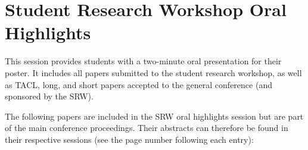 



\section[SRW Oral Highlights]{Student Research Workshop Oral Highlights}
\label{srw-oral-session}

This session provides students with a two-minute oral presentation for
their poster. It includes all papers submitted to the student research
workshop, as well as TACL, long, and short papers accepted to the general
conference (and sponsored by the SRW).



\vspace{0.5in} The following papers are included in the SRW oral
highlights session but are part of the main conference proceedings.
Their abstracts can therefore be found in their respective sessions
(see the page number following each entry):


